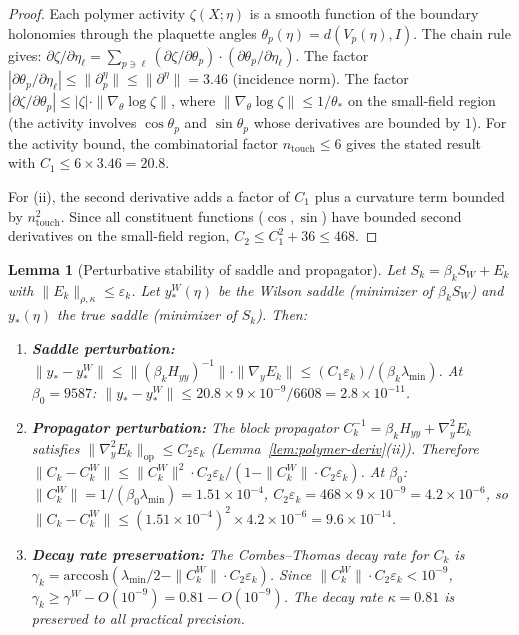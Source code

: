 \documentclass[11pt]{article}
\newtheorem{lemma}[theorem]{Lemma}
\theoremstyle{definition}
\begin{document}
\begin{proof}
Each polymer activity $\zeta(X;\eta)$ is a smooth function
of the boundary holonomies through the plaquette angles
$\theta_p(\eta)=d(V_p(\eta),I)$.  The chain rule gives:
$\partial\zeta/\partial\eta_\ell
=\sum_{p\ni\ell}(\partial\zeta/\partial\theta_p)
\cdot(\partial\theta_p/\partial\eta_\ell)$.
The factor $|\partial\theta_p/\partial\eta_\ell|
\le\|\partial_p^\eta\|\le\|\partial^\eta\|=3.46$
(incidence norm).
The factor $|\partial\zeta/\partial\theta_p|
\le|\zeta|\cdot\|\nabla_\theta\log\zeta\|$,
where $\|\nabla_\theta\log\zeta\|\le 1/\theta_*$
on the small-field region (the activity involves
$\cos\theta_p$ and $\sin\theta_p$ whose derivatives
are bounded by $1$).  For the activity bound, the
combinatorial factor $n_{\mathrm{touch}}\le 6$ gives
the stated result with $C_1\le 6\times 3.46=20.8$.

For (ii), the second derivative adds a factor of $C_1$
plus a curvature term bounded by $n_{\mathrm{touch}}^2$.
Since all constituent functions ($\cos,\sin$) have
bounded second derivatives on the small-field region,
$C_2\le C_1^2+36\le 468$.
\end{proof}

\begin{lemma}[Perturbative stability of saddle and propagator]%
\label{lem:saddle-stability}
Let $S_k=\beta_k S_W+E_k$ with
$\|E_k\|_{\rho,\kappa}\le\varepsilon_k$.
Let $y_*^W(\eta)$ be the Wilson saddle
\textup{(}minimizer of $\beta_k S_W$\textup{)} and
$y_*(\eta)$ the true saddle
\textup{(}minimizer of $S_k$\textup{)}.  Then:
\begin{enumerate}[nosep,label=\textup{(\roman*)}]
\item \textbf{Saddle perturbation:}
$\|y_*-y_*^W\|\le
\|(\beta_k H_{yy})^{-1}\|\cdot\|\nabla_y E_k\|
\le(C_1\varepsilon_k)/(\beta_k\lambda_{\min})$.
At $\beta_0=9587$: $\|y_*-y_*^W\|\le
20.8\times 9\times 10^{-9}/6608=2.8\times 10^{-11}$.
\item \textbf{Propagator perturbation:}
The block propagator $C_k^{-1}=\beta_k H_{yy}+\nabla_y^2 E_k$
satisfies $\|\nabla_y^2 E_k\|_{\mathrm{op}}
\le C_2\varepsilon_k$ (Lemma~\ref{lem:polymer-deriv}(ii)).
Therefore
$\|C_k-C_k^W\|\le\|C_k^W\|^2\cdot C_2\varepsilon_k
/(1-\|C_k^W\|\cdot C_2\varepsilon_k)$.
At $\beta_0$: $\|C_k^W\|=1/(\beta_0\lambda_{\min})=1.51\times 10^{-4}$,
$C_2\varepsilon_k=468\times 9\times 10^{-9}=4.2\times 10^{-6}$,
so $\|C_k-C_k^W\|\le(1.51\times 10^{-4})^2\times
4.2\times 10^{-6}=9.6\times 10^{-14}$.
\item \textbf{Decay rate preservation:}
The Combes--Thomas decay rate for $C_k$ is
$\gamma_k=\mathrm{arccosh}(\lambda_{\min}/2
-\|C_k^W\|\cdot C_2\varepsilon_k)$.
Since $\|C_k^W\|\cdot C_2\varepsilon_k<10^{-9}$,
$\gamma_k\ge\gamma^W-O(10^{-9})=0.81-O(10^{-9})$.
The decay rate $\kappa=0.81$ is preserved to all
practical precision.
\end{enumerate}
\end{lemma}
\end{document}
